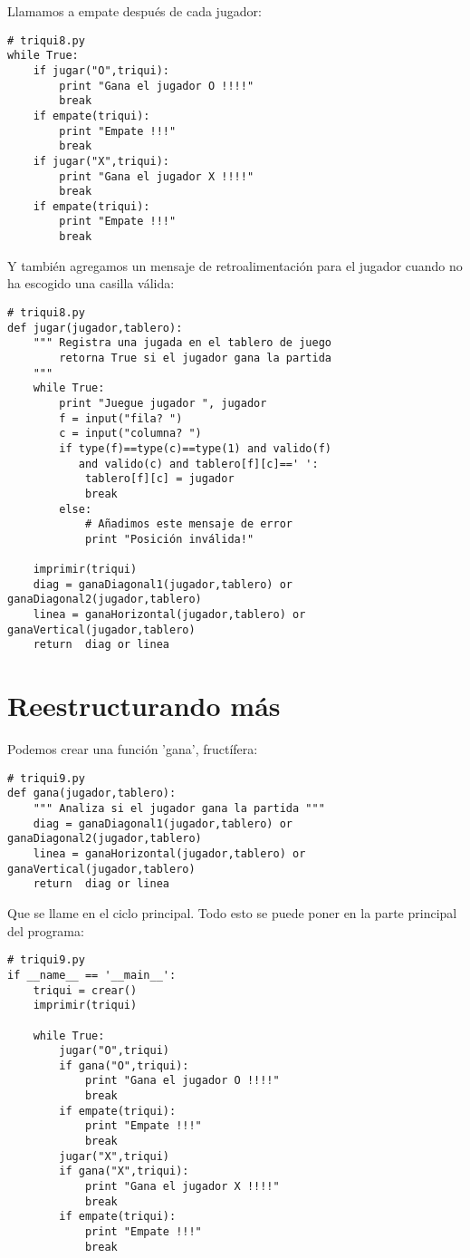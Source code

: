Llamamos a empate después de cada jugador:
\beforeverb
\begin{verbatim}
# triqui8.py
while True:
    if jugar("O",triqui):
        print "Gana el jugador O !!!!"
        break
    if empate(triqui):
        print "Empate !!!"
        break
    if jugar("X",triqui):
        print "Gana el jugador X !!!!"
        break
    if empate(triqui):
        print "Empate !!!"
        break
\end{verbatim}
\afterverb

Y también agregamos un mensaje de retroalimentación para el jugador cuando no 
ha escogido una casilla válida:

\beforeverb
\begin{verbatim}
# triqui8.py
def jugar(jugador,tablero):
    """ Registra una jugada en el tablero de juego
        retorna True si el jugador gana la partida
    """
    while True:     
        print "Juegue jugador ", jugador
        f = input("fila? ")
        c = input("columna? ")
        if type(f)==type(c)==type(1) and valido(f) 
           and valido(c) and tablero[f][c]==' ':
            tablero[f][c] = jugador
            break
        else:
            # Añadimos este mensaje de error
            print "Posición inválida!"

    imprimir(triqui)
    diag = ganaDiagonal1(jugador,tablero) or ganaDiagonal2(jugador,tablero)
    linea = ganaHorizontal(jugador,tablero) or ganaVertical(jugador,tablero)
    return  diag or linea
\end{verbatim}
\afterverb

\section{Reestructurando más}

Podemos crear una función 'gana', fructífera:

\begin{verbatim}
# triqui9.py
def gana(jugador,tablero):
    """ Analiza si el jugador gana la partida """
    diag = ganaDiagonal1(jugador,tablero) or ganaDiagonal2(jugador,tablero)
    linea = ganaHorizontal(jugador,tablero) or ganaVertical(jugador,tablero)
    return  diag or linea

\end{verbatim}
\afterverb

Que se llame en el ciclo principal. Todo esto se puede poner en la parte principal
del programa:

\begin{verbatim}
# triqui9.py
if __name__ == '__main__':
    triqui = crear()
    imprimir(triqui)

    while True:
        jugar("O",triqui)
        if gana("O",triqui):
            print "Gana el jugador O !!!!"
            break
        if empate(triqui):
            print "Empate !!!"
            break
        jugar("X",triqui)
        if gana("X",triqui):
            print "Gana el jugador X !!!!"
            break
        if empate(triqui):
            print "Empate !!!"
            break
\end{verbatim}
\afterverb

